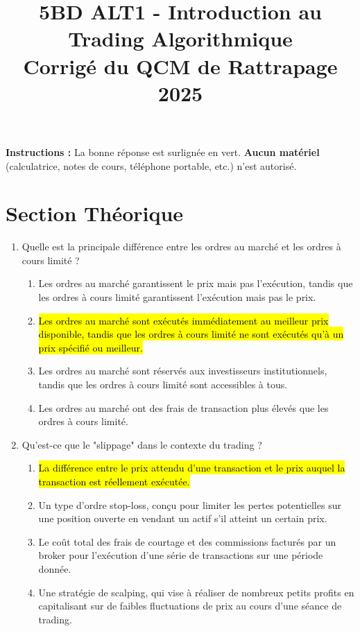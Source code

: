 \documentclass[a4paper,12pt]{article}
\title{5BD ALT1 - Introduction au Trading Algorithmique \\ \textbf{Corrigé du QCM de Rattrapage 2025}}
\author{}
\date{}
\begin{document}
\maketitle

\vspace{1cm}

\textbf{Instructions :} La bonne réponse est surlignée en vert.
\textbf{Aucun matériel} (calculatrice, notes de cours, téléphone portable, etc.) n'est autorisé.

\vspace{0.5cm}

\section*{Section Théorique}

\begin{enumerate}
    \item Quelle est la principale différence entre les ordres au marché et les ordres à cours limité ?
    \begin{enumerate}[label=(\Alph*)]
        \item Les ordres au marché garantissent le prix mais pas l'exécution, tandis que les ordres à cours limité garantissent l'exécution mais pas le prix.
        \item \hl{Les ordres au marché sont exécutés immédiatement au meilleur prix disponible, tandis que les ordres à cours limité ne sont exécutés qu'à un prix spécifié ou meilleur.}
        \item Les ordres au marché sont réservés aux investisseurs institutionnels, tandis que les ordres à cours limité sont accessibles à tous.
        \item Les ordres au marché ont des frais de transaction plus élevés que les ordres à cours limité.
    \end{enumerate}

    \item Qu'est-ce que le "slippage" dans le contexte du trading ?
    \begin{enumerate}[label=(\Alph*)]
        \item \hl{La différence entre le prix attendu d'une transaction et le prix auquel la transaction est réellement exécutée.}
        \item Un type d'ordre stop-loss, conçu pour limiter les pertes potentielles sur une position ouverte en vendant un actif s'il atteint un certain prix.
        \item Le coût total des frais de courtage et des commissions facturés par un broker pour l'exécution d'une série de transactions sur une période donnée.
        \item Une stratégie de scalping, qui vise à réaliser de nombreux petits profits en capitalisant sur de faibles fluctuations de prix au cours d'une séance de trading.
    \end{enumerate}
    

\end{enumerate}
\end{document}
